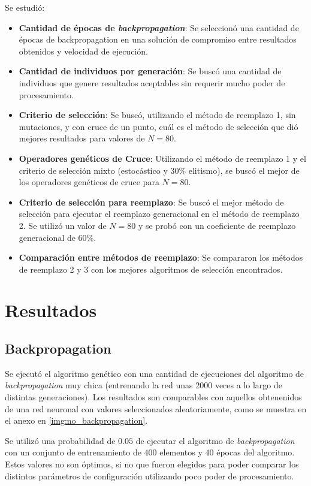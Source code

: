 \documentclass[letterpaper,twocolumn,10pt]{article}
\begin{document}
Se estudió:
\begin{itemize}
  \item \textbf{Cantidad de épocas de \textit{backpropagation}}: Se seleccionó una
    cantidad de épocas de backpropagation en una solución de compromiso entre resultados
    obtenidos y velocidad de ejecución.
  \item \textbf{Cantidad de individuos por generación}: Se buscó una cantidad de
    individuos que genere resultados aceptables sin requerir mucho poder de procesamiento.
  \item \textbf{Criterio de selección}: Se buscó, utilizando el método de reemplazo 1, sin
    mutaciones, y con cruce de un punto, cuál es el método de selección que dió
    mejores resultados para valores de $N = 80$.
  \item \textbf{Operadores genéticos de Cruce}: Utilizando el método de
    reemplazo 1 y el criterio de selección mixto (estocástico y 30\% elitismo), se buscó
    el mejor de los operadores genéticos de cruce para $N = 80$.
  \item \textbf{Criterio de selección para reemplazo}: Se buscó el mejor método de
    selección para ejecutar el reemplazo generacional en el método de reemplazo 2.
    Se utilizó un valor de $N = 80$ y se probó con un coeficiente de reemplazo
    generacional de 60\%.
  \item \textbf{Comparación entre métodos de reemplazo}: Se compararon los métodos de
    reemplazo 2 y 3 con los mejores algoritmos de selección encontrados.
\end{itemize}

\section{Resultados}
\label{sec:res}

\subsection{Backpropagation}

Se ejecutó el algoritmo genético con una cantidad de ejecuciones del algoritmo de
\textit{backpropagation} muy chica (entrenando la red unas 2000 veces a lo largo de
distintas generaciones). Los resultados son comparables con aquellos obtenenidos 
de una red neuronal con valores
seleccionados aleatoriamente, como se muestra en el anexo en \ref{img:no_backpropagation}.

Se utilizó una probabilidad de $0.05$ de ejecutar el algoritmo de \textit{backpropagation}
con un conjunto de entrenamiento de $400$ elementos y $40$ épocas del algoritmo. Estos
valores no son óptimos, si no que fueron elegidos para poder comparar los distintos
parámetros de configuración utilizando poco poder de procesamiento.
\end{document}
